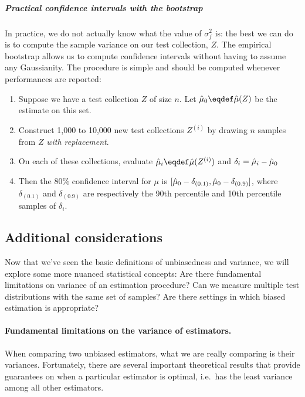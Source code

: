 \subparagraph{Practical confidence intervals with the bootstrap}
In practice, we do not actually know what the value of $\sigma^2_f$ is: the best we can do is to compute the sample variance on our test collection, $Z$.
The empirical bootstrap allows us to compute confidence intervals without having to assume any Gaussianity.
The procedure is simple and should be computed whenever performances are reported:
\begin{enumerate}
  \item Suppose we have a test collection $Z$ of size $n$. Let $\muh_0 \eqdef \muh(Z)$ be the estimate on this set.
  \item Construct 1,000 to 10,000 new test collections $Z^{(i)}$ by drawing $n$ samples from $Z$ \textit{with replacement}.
  \item On each of these collections, evaluate $\muh_{i} \eqdef \muh(Z^{(i)})$ and $\delta_i = \hat{\mu}_i - \hat{\mu}_0$
  \item Then the 80\% confidence interval for $\mu$ is $[\hat{\mu}_0 - \delta_{(0.1)}, \hat{\mu}_0 - \delta_{(0.9)}]$, where $\delta_{(0.1)}$ and $\delta_{(0.9)}$ are respectively the 90th percentile and 10th percentile samples of $\delta_i$. 
\end{enumerate}

\subsection{Additional considerations}
Now that we've seen the basic definitions of unbiasedness and variance, we will explore some more nuanced statistical concepts:
  Are there fundamental limitations on variance of an estimation procedure?
  Can we measure multiple test distributions with the same set of samples?
  Are there settings in which biased estimation is appropriate? 

\paragraph{Fundamental limitations on the variance of estimators.}
When comparing two unbiased estimators, what we are really comparing is their variances.
Fortunately, there are several important theoretical results that provide guarantees on when a particular estimator is optimal, i.e.\ has the least variance among all other estimators.


